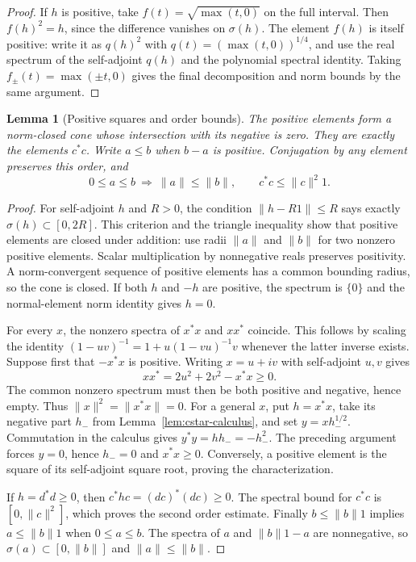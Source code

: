 \documentclass[11pt]{article}
\newtheorem{lemma}[theorem]{Lemma}
\theoremstyle{definition}
\theoremstyle{remark}
\numberwithin{equation}{section}
\begin{document}
\begin{proof}
If $h$ is positive, take $f(t)=\sqrt{\max(t,0)}$ on the full interval.
Then $f(h)^2=h$, since the difference vanishes on $\sigma(h)$.
The element $f(h)$ is itself positive: write it as $q(h)^2$ with
$q(t)=(\max(t,0))^{1/4}$, and use the real spectrum of the self-adjoint
$q(h)$ and the polynomial spectral identity.
Taking $f_\pm(t)=\max(\pm t,0)$ gives the final decomposition and norm
bounds by the same argument.
\end{proof}

\begin{lemma}[Positive squares and order bounds]
\label{lem:cstar-order}
The positive elements form a norm-closed cone whose intersection with its
negative is zero.  They are exactly the elements $c^*c$.
Write $a\leq b$ when $b-a$ is positive.  Conjugation by any element preserves
this order, and
\[
 0\leq a\leq b\ \Longrightarrow\ \|a\|\leq\|b\|,
 \qquad c^*c\leq\|c\|^2 1.
\]
\end{lemma}

\begin{proof}
For self-adjoint $h$ and $R>0$, the condition
$\|h-R1\|\leq R$ says exactly $\sigma(h)\subset[0,2R]$.
This criterion and the triangle inequality show that positive elements
are closed under addition: use radii $\|a\|$ and $\|b\|$ for two nonzero
positive elements.  Scalar multiplication by nonnegative reals preserves
positivity.  A norm-convergent sequence of positive elements has a common
bounding radius, so the cone is closed.  If both $h$ and $-h$ are positive,
the spectrum is $\{0\}$ and the normal-element norm identity gives $h=0$.

For every $x$, the nonzero spectra of $x^*x$ and $xx^*$ coincide.
This follows by scaling the identity
$(1-uv)^{-1}=1+u(1-vu)^{-1}v$ whenever the latter inverse exists.
Suppose first that $-x^*x$ is positive.  Writing $x=u+iv$ with self-adjoint
$u,v$ gives
\[
 xx^*=2u^2+2v^2-x^*x\geq0.
\]
The common nonzero spectrum must then be both positive and negative, hence
empty.  Thus $\|x\|^2=\|x^*x\|=0$.
For a general $x$, put $h=x^*x$, take its negative part $h_-$ from
Lemma~\ref{lem:cstar-calculus}, and set $y=xh_-^{1/2}$.
Commutation in the calculus gives $y^*y=hh_-=-h_-^2$.
The preceding argument forces $y=0$, hence $h_-=0$ and $x^*x\geq0$.
Conversely, a positive element is the square of its self-adjoint square
root, proving the characterization.

If $h=d^*d\geq0$, then $c^*hc=(dc)^*(dc)\geq0$.
The spectral bound for $c^*c$ is $[0,\|c\|^2]$, which proves the second
order estimate.  Finally $b\leq\|b\|1$ implies
$a\leq\|b\|1$ when $0\leq a\leq b$.
The spectra of $a$ and $\|b\|1-a$ are nonnegative, so
$\sigma(a)\subset[0,\|b\|]$ and $\|a\|\leq\|b\|$.
\end{proof}
\end{document}
